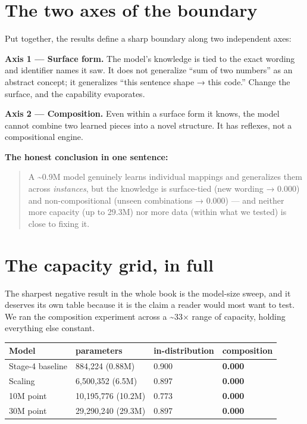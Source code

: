 \section{The two axes of the
boundary}\label{the-two-axes-of-the-boundary}

Put together, the results define a sharp boundary along two independent
axes:

\textbf{Axis 1 --- Surface form.} The model's knowledge is tied to the
exact wording and identifier names it saw. It does not generalize ``sum
of two numbers'' as an abstract concept; it generalizes ``this sentence
shape → this code.'' Change the surface, and the capability evaporates.

\textbf{Axis 2 --- Composition.} Even within a surface form it knows,
the model cannot combine two learned pieces into a novel structure. It
has reflexes, not a compositional engine.

\textbf{The honest conclusion in one sentence:}

\begin{quote}
A \textasciitilde0.9M model genuinely learns individual mappings and
generalizes them across \emph{instances}, but the knowledge is
surface-tied (new wording → 0.000) and non-compositional (unseen
combinations → 0.000) --- and neither more capacity (up to 29.3M) nor
more data (within what we tested) is close to fixing it.
\end{quote}

\section{The capacity grid, in full}\label{the-capacity-grid-in-full}

The sharpest negative result in the whole book is the model-size sweep,
and it deserves its own table because it is the claim a reader would
most want to test. We ran the composition experiment across a
\textasciitilde33× range of capacity, holding everything else constant.

\begin{longtable}[]{@{}llll@{}}
\toprule\noalign{}
Model & parameters & in-distribution & composition \\
\midrule\noalign{}
\endhead
\bottomrule\noalign{}
\endlastfoot
Stage-4 baseline & 884,224 (0.88M) & 0.900 & \textbf{0.000} \\
Scaling & 6,500,352 (6.5M) & 0.897 & \textbf{0.000} \\
10M point & 10,195,776 (10.2M) & 0.773 & \textbf{0.000} \\
30M point & 29,290,240 (29.3M) & 0.897 & \textbf{0.000} \\
\end{longtable}

